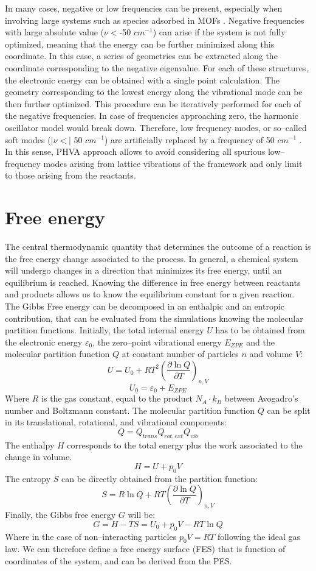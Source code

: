 \npar
In many cases, negative or low frequencies can be present, especially when involving large systems such as species adsorbed in MOFs \cite{DeWispelaere2018}. Negative frequencies with large absolute value ($\nu <$-50 $cm^{-1}$) can arise if the system is not fully optimized, meaning that the energy can be further minimized along this coordinate. In this case, a series of geometries can be extracted along the coordinate corresponding to the negative eigenvalue. For each of these structures, the electronic energy can be obtained with a single point calculation. The geometry corresponding to the lowest energy along the vibrational mode can be then further optimized. This procedure can be iteratively performed for each of the negative frequencies. In case of frequencies approaching zero, the harmonic oscillator model would break down. Therefore, low frequency modes, or so--called soft modes ($|\nu <|$ 50 $cm^{-1}$) are artificially replaced by a frequency of 50 $cm^{-1}$ \cite{DeWispelaere2018}. In this sense, PHVA approach allows to avoid considering all spurious low--frequency modes arising from lattice vibrations of the framework and only limit to those arising from the reactants.

\section{Free energy}
The central thermodynamic quantity that determines the outcome of a reaction is the free energy change associated to the process. In general, a chemical system will undergo changes in a direction that minimizes its free energy, until an equilibrium is reached. Knowing the difference in free energy between reactants and products allows us to know the equilibrium constant for a given reaction. The Gibbs Free energy can be decomposed in an enthalpic and an entropic contribution, that can be evaluated from the simulations knowing the molecular partition functions. Initially, the total internal energy $U$ has to be obtained from the electronic energy $\varepsilon_0$, the zero--point vibrational energy $E_{ZPE}$ and the molecular partition function $Q$ at constant number of particles $n$ and volume $V$:
\[
U = U_{0} + R T^{2}\left(\frac{\partial \ln Q}{\partial T}\right)_{n,V}
\]
\[ U_{0} = \varepsilon_{0} + E_{ZPE} \]
Where $R$ is the gas constant, equal to the product $N_{A}\cdot k_{B}$ between Avogadro's number and Boltzmann constant. The molecular partition function $Q$ can be split in its translational, rotational, and vibrational components:
\[
Q = Q_{trans}Q_{rot, ext}Q_{vib}
\]
The enthalpy $H$ corresponds to the total energy plus the work associated to the change in volume.
\[
H = U + p_{0}V
\] 
The entropy $S$ can be directly obtained from the partition function:
\[
S = R \ln Q + RT \left(\frac{\partial \ln Q}{\partial
T}\right)_{n,V}
\]
Finally, the Gibbs free energy $G$ will be:
\[
G = H - TS = U_{0} + p_{0}V - RT\ln Q
\]
Where in the case of non--interacting particles $p_{0}V = RT$ following the ideal gas law. We can therefore define a free energy surface (FES) that is function of coordinates of the system, and can be derived from the PES.

